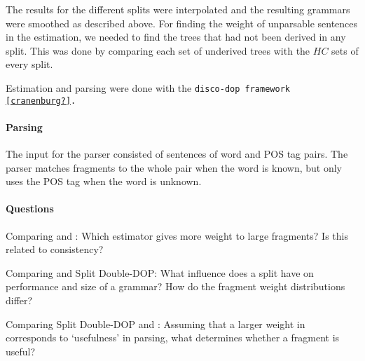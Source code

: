 The results for the different splits were interpolated and the resulting grammars were smoothed as described above. For finding the weight of unparsable sentences in the \dops{} estimation, we needed to find the trees that had not been derived in any split. This was done by comparing each set of underived trees with the $HC$ sets of every split.

Estimation and parsing were done with the \tt{disco-dop} framework \ref{cranenburg?}.

\paragraph{Parsing}
The input for the parser consisted of sentences of word and POS tag pairs. The parser matches fragments to the whole pair when the word is known, but only uses the POS tag when the word is unknown.



\paragraph{Questions}
Comparing \dops{} and \ddop{}: Which estimator gives more weight to large fragments? Is this related to consistency?

Comparing \ddop{} and Split Double-DOP: What influence does a split have on performance and size of a grammar? How do the fragment weight distributions differ?

Comparing Split Double-DOP and \dops{}: Assuming that a larger weight in \dops{} corresponds to `usefulness' in parsing, what determines whether a fragment is useful?


